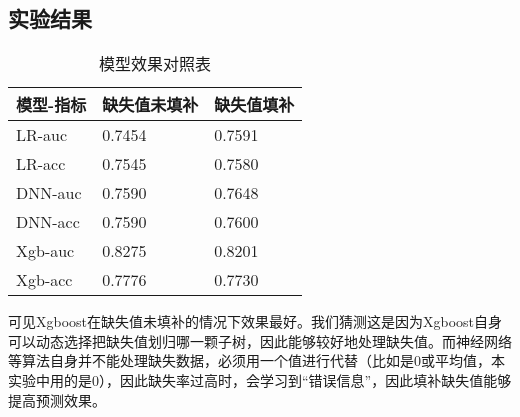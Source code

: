 \subsection{实验结果}
\begin{table}[htb]
    \caption{模型效果对照表}
    \centering
    \begin{tabular}{lll}
    \toprule
    模型-指标 & 缺失值未填补 & 缺失值填补 \\
    \midrule
    LR-auc & 0.7454 & 0.7591 \\
    LR-acc & 0.7545 & 0.7580 \\
    DNN-auc & 0.7590 & 0.7648 \\
    DNN-acc & 0.7590 & 0.7600 \\
    Xgb-auc & 0.8275 & 0.8201 \\
    Xgb-acc & 0.7776 & 0.7730 \\
    \bottomrule
    \end{tabular}
\end{table}

可见Xgboost在缺失值未填补的情况下效果最好。我们猜测这是因为Xgboost自身可以动态选择把缺失值划归哪一颗子树，因此能够较好地处理缺失值。而神经网络等算法自身并不能处理缺失数据，必须用一个值进行代替（比如是0或平均值，本实验中用的是0），因此缺失率过高时，会学习到“错误信息”，因此填补缺失值能够提高预测效果。